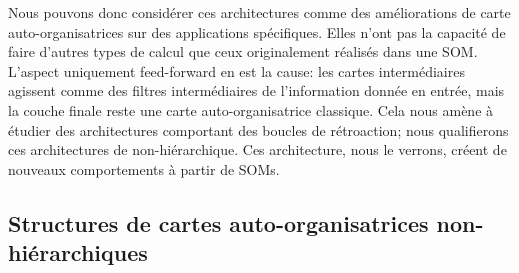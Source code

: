 \documentclass[../main]{subfiles}
\begin{document}
Nous pouvons donc considérer ces architectures comme des améliorations de carte auto-organisatrices sur des applications spécifiques. Elles n'ont pas la capacité de faire d'autres types de calcul que ceux originalement réalisés dans une SOM.
L'aspect uniquement feed-forward en est la cause: les cartes intermédiaires agissent comme des filtres intermédiaires de l'information donnée en entrée, mais la couche finale reste une carte auto-organisatrice classique.
Cela nous amène à étudier des architectures comportant des boucles de rétroaction; nous qualifierons ces architectures de non-hiérarchique. Ces architecture, nous le verrons, créent de nouveaux comportements à partir de SOMs.



\subsection{Structures de cartes auto-organisatrices non-hiérarchiques}
\end{document}

